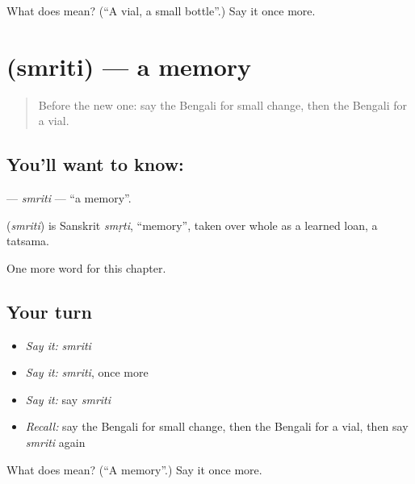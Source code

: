 \begin{tcolorbox}[breakable,colback=teal!4,colframe=teal!35!black,title={Before you move on}]
What does  mean? (\textquotedblleft{}A vial, a small bottle\textquotedblright{}.) Say it once more.
\end{tcolorbox}
\section[\texorpdfstring{\bn{স্মৃতি} (smriti)}{স্মৃতি (smriti)}]{ (smriti) — a memory}

\label{lesson:BN-C234-smriti}



\begin{quote}
Before the new one: say the Bengali for small change, then the Bengali for a vial.
\end{quote}

\subsection*{You'll want to know: }
\textbf{} — \emph{smriti} — \textquotedblleft{}a memory\textquotedblright{}.

\begin{cousinweb}
\textbf{} (\emph{smriti}) is Sanskrit \emph{smṛti}, \textquotedblleft{}memory\textquotedblright{}, taken over whole as a learned loan, a tatsama.
\end{cousinweb}

\begin{grammarlens}[title={What you've built}]
One more word for this chapter.
\end{grammarlens}

\subsection*{Your turn}
\begin{itemize}
\raggedright
  \item \emph{Say it:} \emph{smriti}
  \item \emph{Say it:} \emph{smriti}, once more
  \item \emph{Say it:} say \emph{smriti}
  \item \emph{Recall:} say the Bengali for small change, then the Bengali for a vial, then say \emph{smriti} again
\end{itemize}

\begin{tcolorbox}[breakable,colback=teal!4,colframe=teal!35!black,title={Before you move on}]
What does  mean? (\textquotedblleft{}A memory\textquotedblright{}.) Say it once more.
\end{tcolorbox}
